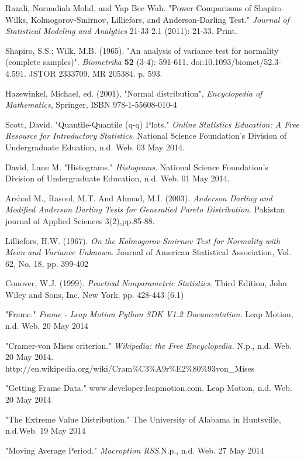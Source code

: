 \documentclass[letterpaper,english, 12pt]{article}
\begin{document}
\begin{thebibliography}{1}

	 Razali, Nornadiah Mohd, and Yap Bee Wah. "Power Comparisons of Shapiro-Wilks, Kolmogorov-Smirnov, Lilliefors, and Anderson-Darling Test." {\em Journal of Statistical Modeling and Analytics} 21-33 2.1 (2011): 21-33. Print.
		
	 Shapiro, S.S.; Wilk, M.B. (1965). "An analysis of variance test for normality (complete samples)". {\em Biometrika} \textbf{52} (3-4):  591-611. doi:10.1093/biomet/52.3-4.591. JSTOR 2333709. MR 205384. p. 593.

	 Hazewinkel, Michael, ed. (2001), "Normal distribution", {\em Encyclopedia of Mathematics}, Springer, ISBN 978-1-55608-010-4

	 Scott, David. "Quantile-Quantile (q-q) Plots." {\em Online Statistics Education: A Free Resource for Introductory Statistics}. National Science Foundation's Division of Undergraduate Eduation, n.d. Web. 03 May 2014.

	 David, Lane M. "Histograms." {\em Histograms}. National Science Foundation's Division of Undergraduate Education, n.d. Web. 01 May 2014.

	 Arshad M., Rasool, M.T. And Ahmad, M.I. (2003). {\em Anderson Darling and Modified Anderson Darling Tests for Generalied Pareto Distribution}. Pakistan journal of Applied Sciences 3(2),pp.85-88.

	 Lilliefors, H.W. (1967). {\em On the Kolmogorov-Smirnov Test for Normality with Mean and Variance Unknown}. Journal of American Statistical Association, Vol. 62, No. 18, pp. 399-402

	 Conover, W.J. (1999). {\em Practical Nonparametric Statistics}. Third Edition, John Wiley and Sons, Inc. New York. pp. 428-443 (6.1)
	
	 "Frame." {\em Frame - Leap Motion Python SDK V1.2 Documentation.} Leap Motion, n.d. Web. 20 May 2014
		
	 "Cramer-von Mises criterion." {\em Wikipedia: the Free Encyclopedia.} N.p., n.d. Web. 20 May 2014. http://en.wikipedia.org/wiki/Cram\%C3\%A9r\%E2\%80\%93von\_Mises

	 "Getting Frame Data." www.developer.leapmotion.com. Leap Motion, n.d. Web. 20 May 2014

	 "The Extreme Value Distribution." The University of Alabama in Huntsville, n.d.Web. 19 May 2014

	 "Moving Average Period." {\em Macroption RSS}.N.p., n.d. Web. 27 May 2014
\end{thebibliography}
\end{document}
